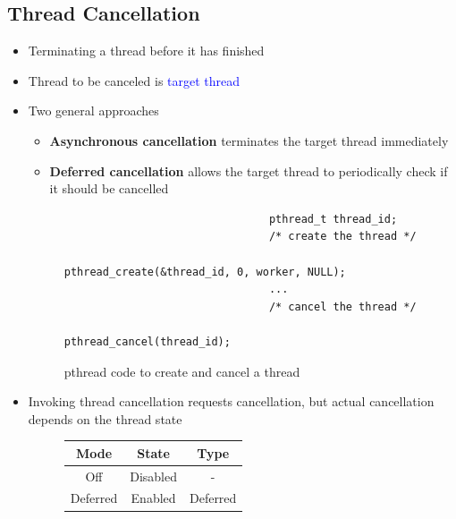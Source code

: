\documentclass{book/custombook}
\begin{document}
            \subsection{Thread Cancellation}
                \begin{itemize}
                    \item Terminating a thread before it has finished
                    \item Thread to be canceled is \textcolor{blue}{target thread}
                    \item Two general approaches
                        \begin{itemize}
                            \item \textbf{Asynchronous cancellation} terminates the target thread immediately
                            \item \textbf{Deferred cancellation} allows the target thread to periodically check if it should be cancelled
                        \end{itemize}
                        \begin{figure}[H]
                            \begin{verbatim}
                                pthread_t thread_id;
                                /* create the thread */
                                pthread_create(&thread_id, 0, worker, NULL);
                                ...
                                /* cancel the thread */
                                pthread_cancel(thread_id);
                            \end{verbatim}
                            \caption{pthread code to create and cancel a thread}
                        \end{figure}
                    \item Invoking thread cancellation requests cancellation, but actual cancellation depends on the thread state
                        \begin{figure}[H]
                            \centering
                            \begin{tabular}{|c|c|c|}
                                \hline
                                \textbf{Mode} & \textbf{State} & \textbf{Type}\\
                                \hline
                                Off & Disabled & -\\
                                \hline
                                Deferred & Enabled & Deferred\\

\end{tabular}
\end{figure}
\end{itemize}
\end{document}
